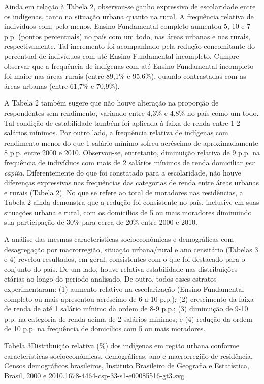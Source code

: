 \documentclass{article}
\begin{document}
Ainda em relação à Tabela 2, observou-se ganho expressivo de escolaridade entre
os indígenas, tanto na situação urbana quanto na rural. A frequência relativa de
indivíduos com, pelo menos, Ensino Fundamental completo aumentou 5, 10 e 7 p.p.
(pontos percentuais) no país com um todo, nas áreas urbanas e nas rurais,
respectivamente. Tal incremento foi acompanhado pela redução concomitante do
percentual de indivíduos com até Ensino Fundamental incompleto. Cumpre observar
que a frequência de indígenas com até Ensino Fundamental incompleto foi maior
nas áreas rurais (entre 89,1\% e 95,6\%), quando contrastadas com as áreas
urbanas (entre 61,7\% e 70,9\%).

A Tabela 2 também sugere que não houve alteração na proporção de respondentes
sem rendimento, variando entre 4,3\% e 4,8\% no país como um todo. Tal condição
de estabilidade também foi aplicada à faixa de renda entre 1-2 salários mínimos.
Por outro lado, a frequência relativa de indígenas com rendimento menor do que 1
salário mínimo sofreu acréscimo de aproximadamente 8 p.p. entre 2000 e 2010.
Observou-se, entretanto, diminuição relativa de 9 p.p. na frequência de
indivíduos com mais de 2 salários mínimos de renda domiciliar \textit{per
capita}. Diferentemente do que foi constatado para a escolaridade, não houve diferenças
expressivas nas frequências das categorias de renda entre áreas urbanas e rurais
(Tabela 2). No que se refere ao total de moradores nas residências, a Tabela 2
ainda demonstra que a redução foi consistente no país, inclusive em suas
situações urbana e rural, com os domicílios de 5 ou mais moradores diminuindo
sua participação de 30\% para cerca de 20\% entre 2000 e 2010.

A análise das mesmas características socioeconômicas e demográficas com
desagregação por macrorregião, situação urbana/rural e ano censitário (Tabelas 3
e 4) revelou resultados, em geral, consistentes com o que foi destacado para o
conjunto do país. De um lado, houve relativa estabilidade nas distribuições
etárias ao longo do período analisado. De outro, todos esses estratos
experimentaram: (1) aumento relativo na escolarização (Ensino Fundamental
completo ou mais apresentou acréscimo de 6 a 10 p.p.); (2) crescimento da faixa
de renda de até 1 salário mínimo da ordem de 8-9 p.p.; (3) diminuição de 9-10
p.p. na categoria de renda acima de 2 salários mínimos; e (4) redução da ordem
de 10 p.p. na frequência de domicílios com 5 ou mais moradores.

Tabela 3Distribuição relativa (\%) dos indígenas em região urbana conforme
características socioeconômicas, demográficas, ano e macrorregião de residência.
Censos demográficos brasileiros, Instituto Brasileiro de Geografia e
Estatística, Brasil, 2000 e 2010.1678-4464-csp-33-s1-e00085516-gt3.svg
\end{document}
